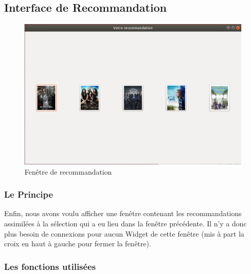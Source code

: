 \documentclass{article}
\begin{document}
\subsection{Interface de Recommandation}

    \begin{figure}[h]
        \centering
        \includegraphics[scale=0.4]{InterfaceRecommandation.png}
        \caption{Fenêtre de recommandation}
    \label{SMART}
    \end{figure}

\subsubsection{Le Principe}

Enfin, nous avons voulu afficher une fenêtre contenant les recommandations assimilées à la sélection qui a eu lieu dans la fenêtre précédente. Il n'y a donc plus besoin de connexions pour aucun Widget de cette fenêtre (mis à part la croix en haut à gauche pour fermer la fenêtre).

\subsubsection{Les fonctions utilisées}
\end{document}
